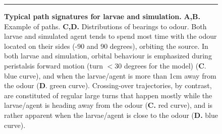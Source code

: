 \documentclass[11pt,a4paper]{article}
\begin{document}
%


\begin{figure}[ht!]
\begin{center}
\caption{{\bf Typical path signatures for larvae and simulation.} {\bf A,B.} Example of paths. {\bf C,D.} Distributions of bearings to odour.
 Both larvae and simulated agent tends to spend most time with the odour located on their sides (-90 and 90 degrees), orbiting the source. In both larvae and simulation, orbital behaviour is emphasized during peristalsis forward motion (turn $<30$ degrees for the model) ({\bf C}. blue curve), and when the larvae/agent is more than 1cm away from the odour ({\bf D}. green curve). Crossing-over trajectories, by contrast, are constituted of regular large turns that happen mostly while the larvae/agent is heading away from the odour ({\bf C.} red curve), and is rather apparent when the larvae/agent is close to the odour ({\bf D.} blue curve).
\label{fig:PathSignatures}}
\end{center}
\hrule
\end{figure}
\end{document}

